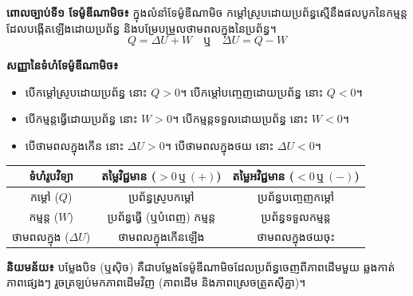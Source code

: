 \textbf{ពោលច្បាប់ទី១ ទែម៉ូឌីណាមិច៖} ក្នុងលំនាំទែម៉ូឌីណាមិច កម្ដៅស្រូបដោយប្រព័ន្ធស្មើនឹងផលបូកនៃកម្មន្តដែលបង្កើតឡើងដោយប្រព័ន្ធ និងបម្រែបម្រួលថាមពលក្នុងនៃប្រព័ន្ធ។
\begin{equation}
				Q = \Delta U + W \quad \mbox{ឬ} \quad \Delta U = Q - W
\end{equation}

\textbf{សញ្ញានៃទំហំទែម៉ូឌីណាមិច៖}
\begin{itemize}
	\item បើកម្ដៅស្រូបដោយប្រព័ន្ធ នោះ $Q > 0$។ បើកម្ដៅបញ្ចេញដោយប្រព័ន្ធ នោះ $Q < 0$។
	\item បើកម្មន្តធ្វើដោយប្រព័ន្ធ នោះ $W > 0$។ បើកម្មន្តទទួលដោយប្រព័ន្ធ នោះ $W < 0$។
	\item បើថាមពលក្នុងកើន នោះ $\Delta U > 0$។ បើថាមពលក្នុងថយ នោះ $\Delta U < 0$។
\end{itemize}

\vspace{0.3cm}
\begin{center}
	\renewcommand{\arraystretch}{1.5} %
	\begin{tabular}{|c|c|c|}
		\hline
		\textcolor{brownheader}{\textbf{ទំហំរូបវិទ្យា}} & \textcolor{brownheader}{\textbf{តម្លៃវិជ្ជមាន ($> 0\,\mbox{ឬ}\,(+)$)}} & \textcolor{brownheader}{\textbf{តម្លៃអវិជ្ជមាន ($< 0\,\mbox{ឬ}\,(-)$)}} \\
		\hline
		កម្ដៅ ($Q$) & ប្រព័ន្ធស្រូបកម្ដៅ & ប្រព័ន្ធបញ្ចេញកម្ដៅ \\
		\hline
		កម្មន្ត ($W$) & ប្រព័ន្ធធ្វើ (ឬបំពេញ) កម្មន្ត & ប្រព័ន្ធទទួលកម្មន្ត \\
		\hline
		ថាមពលក្នុង ($\Delta U$) & ថាមពលក្នុងកើនឡើង & ថាមពលក្នុងថយចុះ \\
		\hline
	\end{tabular}
\end{center}
\vspace{0.3cm}
	
	\vspace{0.5cm}

\textbf{និយមន័យ៖} បម្លែងបិទ (ឬស៊ិច) គឺជាបម្លែងទែម៉ូឌីណាមិចដែលប្រព័ន្ធចេញពីភាពដើមមួយ ឆ្លងកាត់ភាពផ្សេងៗ រួចត្រឡប់មកភាពដើមវិញ (ភាពដើម និងភាពស្រេចត្រួតស៊ីគ្នា)។

